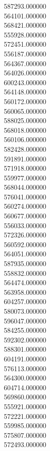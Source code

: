 587293.000000\\
564101.000000\\
568421.000000\\
555928.000000\\
572451.000000\\
556187.000000\\
564367.000000\\
564026.000000\\
600243.000000\\
564148.000000\\
560172.000000\\
560065.000000\\
588025.000000\\
568018.000000\\
560106.000000\\
582428.000000\\
591891.000000\\
571918.000000\\
559977.000000\\
568044.000000\\
576041.000000\\
560274.000000\\
560677.000000\\
556033.000000\\
572326.000000\\
560592.000000\\
564051.000000\\
587935.000000\\
558832.000000\\
564474.000000\\
563958.000000\\
604257.000000\\
580073.000000\\
596047.000000\\
584255.000000\\
592302.000000\\
588301.000000\\
604191.000000\\
576113.000000\\
564300.000000\\
604714.000000\\
569860.000000\\
555921.000000\\
572221.000000\\
559985.000000\\
575807.000000\\
572493.000000\\
